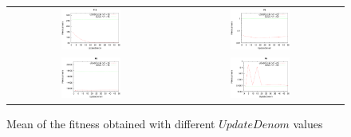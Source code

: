 \documentclass[review,3p]{elsarticle}
\begin{document}
      
\begin{figure}[!t]
\centering
\begin{tabular}{cc}
  \includegraphics[width=0.37\textwidth]{images/Update/GODE/Update_GODE_F14_15.eps} & \includegraphics[width=0.37\textwidth]{images/Update/GODE/Update_GODE_F4_60.eps}  \\
  \includegraphics[width=0.37\textwidth]{images/Update/GADE/Update_GADE_F8_15.eps} & \includegraphics[width=0.37\textwidth]{images/Update/GADE/Update_GADE_F9_60.eps}  \\
\end{tabular}
\caption{Mean of the fitness obtained with different $UpdateDenom$ values}
\label{fig:updateDenom}
\end{figure}
\end{document}
